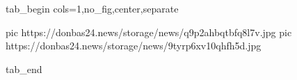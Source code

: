  
 
 
 
 

\ifcmt
  tab_begin cols=1,no_fig,center,separate

     pic https://donbas24.news/storage/news/q9p2ahbqtbfq8l7v.jpg
     pic https://donbas24.news/storage/news/9tyrp6xv10qhfh5d.jpg

  tab_end
\fi
